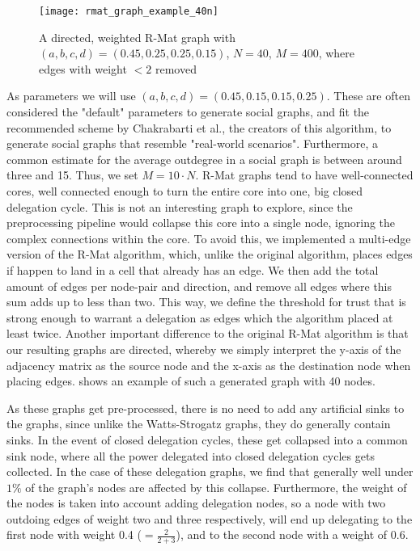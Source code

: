 \begin{figure}
\centering
\texttt{[image: rmat\_graph\_example\_40n]}
\caption{A directed, weighted R-Mat graph with $(a, b, c, d) = (0.45, 0.25, 0.25, 0.15)$, $N = 40$, $M = 400$, where edges with weight $< 2$ removed}
\label{fig:rmat_example}
\end{figure}

As parameters we will use $(a, b, c, d) = (0.45, 0.15, 0.15, 0.25)$. These are often considered the "default" parameters to generate social graphs, and fit the recommended scheme by Chakrabarti et al., the creators of this algorithm, to generate social graphs that resemble "real-world scenarios". \cite{chakrabartiRMATRecursiveModel2004, zhouKanonymityLdiversityApproaches2011} Furthermore, a common estimate for the average outdegree in a social graph is between around three and 15. Thus, we set $M = 10 \cdot N$. R-Mat graphs tend to have well-connected cores, well connected enough to turn the entire core into one, big closed delegation cycle. This is not an interesting graph to explore, since the preprocessing pipeline would collapse this core into a single node, ignoring the complex connections within the core. To avoid this, we implemented a multi-edge version of the R-Mat algorithm, which, unlike the original algorithm, places edges if happen to land in a cell that already has an edge. We then add the total amount of edges per node-pair and direction, and remove all edges where this sum adds up to less than two. This way, we define the threshold for trust that is strong enough to warrant a delegation as edges which the algorithm placed at least twice. Another important difference to the original R-Mat algorithm is that our resulting graphs are directed, whereby we simply interpret the y-axis of the adjacency matrix as the source node and the x-axis as the destination node when placing edges.  shows an example of such a generated graph with 40 nodes.

As these graphs get pre-processed, there is no need to add any artificial sinks to the graphs, since unlike the Watts-Strogatz graphs, they do generally contain sinks. In the event of closed delegation cycles, these get collapsed into a common sink node, where all the power delegated into closed delegation cycles gets collected. In the case of these delegation graphs, we find that generally well under $1\%$ of the graph's nodes are affected by this collapse. Furthermore, the weight of the nodes is taken into account adding delegation nodes, so a node with two outdoing edges of weight two and three respectively, will end up delegating to the first node with weight 0.4 ($= \frac{2}{2+3}$), and to the second node with a weight of 0.6.


